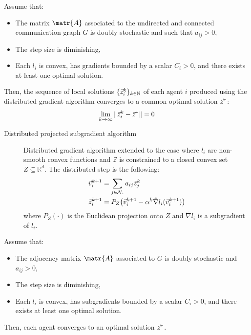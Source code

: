 \begin{theorem} 
    Assume that:
    \begin{itemize}
        \item The matrix $\matr{A}$ associated to the undirected and connected communication graph $G$ is doubly stochastic and such that $a_{ij} > 0$,
        \item The step size is diminishing,
        \item Each $l_i$ is convex, has gradients bounded by a scalar $C_i > 0$, and there exists at least one optimal solution.
    \end{itemize}
    Then, the sequence of local solutions $\{ {\vec{z}}_i^k \}_{k \in \mathbb{N}}$ of each agent $i$ produced using the distributed gradient algorithm converges to a common optimal solution ${\vec{z}}^*$:
    \[ \lim_{k \rightarrow \infty} \Vert {\vec{z}}_i^k - {\vec{z}}^* \Vert = 0 \]
\end{theorem}


\begin{description}
    \item[Distributed projected subgradient algorithm] 
        Distributed gradient algorithm extended to the case where $l_i$ are non-smooth convex functions and ${\vec{z}}$ is constrained to a closed convex set $Z \subseteq \mathbb{R}^d$. The distributed step is the following:
        \[
            \begin{split}
                \vec{v}_i^{k+1} &= \sum_{j \in \mathcal{N}_i} a_{ij} {\vec{z}}_j^k \\
                {\vec{z}}_i^{k+1} &= P_Z \big( \vec{v}_i^{k+1} - \alpha^k \tilde{\nabla} l_i(\vec{v}_i^{k+1}) \big)
            \end{split}
        \]
        where $P_Z(\cdot)$ is the Euclidean projection onto $Z$ and $\tilde{\nabla} l_i$ is a subgradient of $l_i$.
\end{description}

\begin{theorem} 
    Assume that:
    \begin{itemize}
        \item The adjacency matrix $\matr{A}$ associated to $G$ is doubly stochastic and $a_{ij} > 0$,
        \item The step size is diminishing,
        \item Each $l_i$ is convex, has subgradients bounded by a scalar $C_i > 0$, and there exists at least one optimal solution.
    \end{itemize}
    Then, each agent converges to an optimal solution ${\vec{z}}^*$.
\end{theorem}

